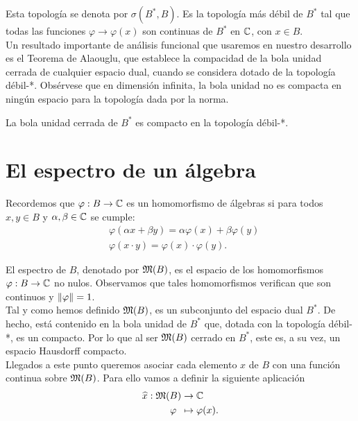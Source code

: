 Esta topología se denota por $\sigma(B^*, B)$. Es la topología más débil de $B^*$ tal que todas las funciones $\varphi \to \varphi(x)$ son continuas de $B^*$ en $\mathbb{C}$, con $x \in B$. \\ %

Un resultado importante de análisis funcional que usaremos en nuestro desarrollo es el Teorema de Alaouglu, que establece la compacidad de la bola unidad cerrada de cualquier espacio dual, cuando se considera dotado de la topología débil-*. Obsérvese que en dimensión infinita, la bola unidad no es compacta en ningún espacio para la topología dada por la norma. \\

\begin{theorem}[de Alaouglu]
    La bola unidad cerrada de $B^*$ es compacto en la topología débil-*.
\end{theorem}

\section{El espectro de un álgebra}

Recordemos que $\varphi: B \to \mathbb{C}$ es un homomorfismo de álgebras si para todos $x, y \in B$ y $\alpha, \beta \in \mathbb{C}$ se cumple:
\begin{equation}
    \begin{split}
        & \varphi (\alpha x + \beta y) = \alpha \varphi(x) + \beta \varphi(y) \\
        & \varphi(x \cdot y) = \varphi(x) \cdot \varphi(y).
    \end{split}
\end{equation}

El espectro de $B$, denotado por $\mathfrak{M}(B)$, es el espacio de los homomorfismos $\varphi: B \to \mathbb{C}$ no nulos. Observamos que tales homomorfismos verifican que son continuos y $\left\lVert\varphi\right\rVert = 1$. \\

Tal y como hemos definido $\mathfrak{M}(B)$, es un subconjunto del espacio dual $B^*$. De hecho, está contenido en la bola unidad de $B^*$ que, dotada con la topología débil-*, es un compacto. Por lo que al ser $\mathfrak{M}(B)$ cerrado en $B^*$, este es, a su vez, un espacio Hausdorff compacto. \\

Llegados a este punto queremos asociar cada elemento $x$ de $B$ con una función continua sobre $\mathfrak{M}(B)$. Para ello vamos a definir la siguiente aplicación
\begin{equation*}
    \begin{split}
        \widehat x:  \mathfrak{M}(B) & \to  \mathbb{C} \\
              \varphi \, \, \, & \mapsto  \varphi (x).
    \end{split}
\end{equation*}

